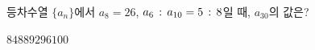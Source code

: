 등차수열 $\{a_n\}$에서 $a_8=26$, $a_6\mkern3mu :\mkern3mu a_{10}=5\mkern3mu :\mkern3mu 8$일 때, $a_{30}$의 값은?
\begin{choices32}{$84$}{$88$}{$92$}{$96$}{$100$}\end{choices32}

